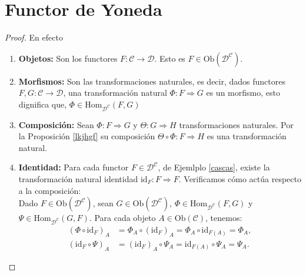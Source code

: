 \section{Functor de Yoneda}



\begin{proposicion}
\end{proposicion}

\begin{proof}
	En efecto
	\begin{enumerate}
		
		\item \textbf{Objetos:} Son los functores \(F : \mathcal{C} \to \mathcal{D}\). Esto es $F\in \mathrm{Ob}\left(\mathcal{D}^\mathcal{C}\right)$.
		
		\item \textbf{Morfismos:} Son las transformaciones naturales, es decir, dados functores \(F, G : \mathcal{C} \to \mathcal{D}\), una transformación natural \(\Phi : F \Longrightarrow G\) es un morfismo, esto dignifica que, $\Phi \in \mathrm{Hom}_{\mathcal{D}^\mathcal{C}}(F,G)$
		
		\item \textbf{Composición:} Sean \(\Phi : F \Longrightarrow G\) y \(\Theta : G \Longrightarrow H\) transformaciones naturales. Por la Proposición \ref{lkjhgf} su composición \(\Theta \circ \Phi : F \Longrightarrow H\) es una transformación natural.
		
		\item \textbf{Identidad:} Para cada functor \(F\in \mathcal{D}^\mathcal{C}\), de Ejemlplo \ref{cascas}, existe la transformación natural identidad \(\mathrm{id}_F : F \Rightarrow F\). Verificamos cómo actúa respecto a la composición: \\
		
		\noindent Dado \(F \in \mathrm{Ob}(\mathcal{D}^\mathcal{C})\), sean \(G \in \mathrm{Ob}(\mathcal{D}^\mathcal{C})\), \(\Phi \in \mathrm{Hom}_{\mathcal{D}^\mathcal{C}}(F, G)\) y \(\Psi \in \mathrm{Hom}_{\mathcal{D}^\mathcal{C}}(G, F)\). Para cada objeto \(A \in \mathrm{Ob}(\mathcal{C})\), tenemos:
		\begin{align*}
			(\Phi \circ \mathrm{id}_F)_A &= \Phi_A \circ (\mathrm{id}_F)_A = \Phi_A \circ \mathrm{id}_{F(A)} = \Phi_A, \\
			(\mathrm{id}_F \circ \Psi)_A &= (\mathrm{id}_F)_A \circ \Psi_A = \mathrm{id}_{F(A)} \circ \Psi_A = \Psi_A.
		\end{align*}
		

\end{enumerate}
\end{proof}
